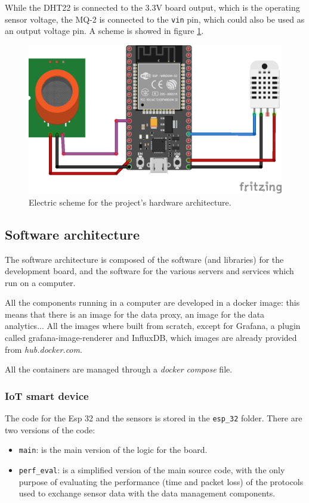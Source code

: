 \documentclass[]{article}
\begin{document}
While the DHT22 is connected to the 3.3V board output, which is the operating sensor voltage, the MQ-2 is connected to the \texttt{vin} pin, which could also be used as an output voltage pin. A scheme is showed in figure \ref{scheme}.


\begin{figure}[h]
	\centering
	\includegraphics[width=0.6\linewidth]{img/scheme.png}
	\caption{Electric scheme for the project's hardware architecture.}
	\label{scheme}
\end{figure}


\subsection{Software architecture}\label{arch}
The software architecture is composed of the software (and libraries) for the development board, and the software for the various servers and services which run on a computer. 

All the components running in a computer are developed in a docker image: this means that there is an image for the data proxy, an image for the data analytics... All the images where built from scratch, except for Grafana, a plugin called grafana-image-renderer and InfluxDB, which images are already provided from \textit{hub.docker.com}.

All the containers are managed through a \textit{docker compose} file. 

\subsubsection{IoT smart device}
The code for the Esp 32 and the sensors is stored in the \texttt{esp\_32} folder. There are two versions of the code:
\begin{itemize}
	\item \texttt{main}: is the main version of the logic for the board.
	\item \texttt{perf\_eval}: is a simplified version of the main source code, with the only purpose of evaluating the performance (time and packet loss) of the protocols used to exchange sensor data with the data management components. 
\end{itemize}
\end{document}

